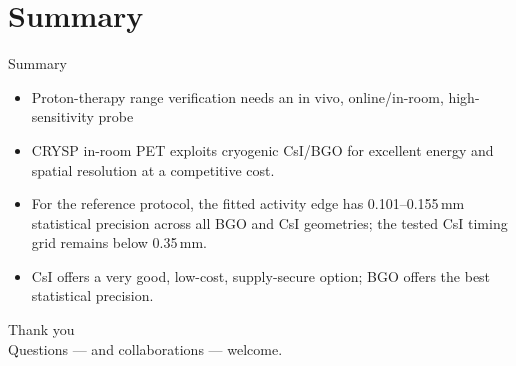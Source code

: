 \documentclass[aspectratio=169,11pt]{beamer}
\newcommand{\hi}[1]{\textcolor{crRed}{#1}}
\begin{document}
\section{Summary}

\begin{frame}{Summary}
  \begin{itemize}
    \item Proton-therapy range verification needs an \hi{in vivo}, online/in-room,
      high-sensitivity probe
    \item \hi{CRYSP in-room PET} exploits cryogenic CsI/BGO for excellent energy
      and spatial resolution at a \hi{competitive cost}.
    \item For the reference protocol, the fitted activity edge has
      \hi{0.101--0.155\,mm statistical precision} across all BGO and CsI
      geometries; the tested CsI timing grid remains below 0.35\,mm.
    \item CsI offers a very good, low-cost, supply-secure option; BGO offers
      the best statistical precision.
  \end{itemize}
  \vspace{3mm}
\end{frame}

{
\begin{frame}[plain]
  \centering
  {\color{crBlue}\Large Thank you}\\[3mm]
  {\color{crGrey} Questions --- and collaborations --- welcome.}
\end{frame}}
\end{document}
